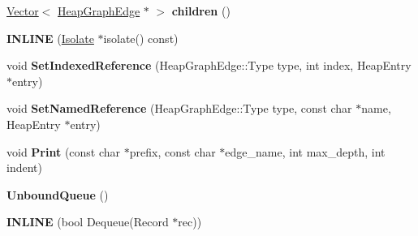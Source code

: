 \begin{DoxyCompactItemize}
\item 
\hyperlink{classv8_1_1internal_1_1_vector}{Vector}$<$ \hyperlink{classv8_1_1_heap_graph_edge}{Heap\+Graph\+Edge} $\ast$ $>$ {\bfseries children} ()\hypertarget{classv8_1_1internal_1_1_b_a_s_e___e_m_b_e_d_d_e_d_aa741a059de0f22e9ae33e42d264973ef}{}\label{classv8_1_1internal_1_1_b_a_s_e___e_m_b_e_d_d_e_d_aa741a059de0f22e9ae33e42d264973ef}

\item 
{\bfseries I\+N\+L\+I\+NE} (\hyperlink{classv8_1_1internal_1_1_isolate}{Isolate} $\ast$isolate() const)\hypertarget{classv8_1_1internal_1_1_b_a_s_e___e_m_b_e_d_d_e_d_abe48395c5889049313cd023c1f5b0589}{}\label{classv8_1_1internal_1_1_b_a_s_e___e_m_b_e_d_d_e_d_abe48395c5889049313cd023c1f5b0589}

\item 
void {\bfseries Set\+Indexed\+Reference} (Heap\+Graph\+Edge\+::\+Type type, int index, Heap\+Entry $\ast$entry)\hypertarget{classv8_1_1internal_1_1_b_a_s_e___e_m_b_e_d_d_e_d_a05322892c3a11c74aaf0c2742f7a133d}{}\label{classv8_1_1internal_1_1_b_a_s_e___e_m_b_e_d_d_e_d_a05322892c3a11c74aaf0c2742f7a133d}

\item 
void {\bfseries Set\+Named\+Reference} (Heap\+Graph\+Edge\+::\+Type type, const char $\ast$name, Heap\+Entry $\ast$entry)\hypertarget{classv8_1_1internal_1_1_b_a_s_e___e_m_b_e_d_d_e_d_a89f646b0a35a85b0e7f8d8d2a692c996}{}\label{classv8_1_1internal_1_1_b_a_s_e___e_m_b_e_d_d_e_d_a89f646b0a35a85b0e7f8d8d2a692c996}

\item 
void {\bfseries Print} (const char $\ast$prefix, const char $\ast$edge\+\_\+name, int max\+\_\+depth, int indent)\hypertarget{classv8_1_1internal_1_1_b_a_s_e___e_m_b_e_d_d_e_d_acc9a65d9f6aff672c4c526cc0b6301fd}{}\label{classv8_1_1internal_1_1_b_a_s_e___e_m_b_e_d_d_e_d_acc9a65d9f6aff672c4c526cc0b6301fd}

\item 
{\bfseries Unbound\+Queue} ()\hypertarget{classv8_1_1internal_1_1_b_a_s_e___e_m_b_e_d_d_e_d_a1641cbdb26c90cdf84290c658b1578a9}{}\label{classv8_1_1internal_1_1_b_a_s_e___e_m_b_e_d_d_e_d_a1641cbdb26c90cdf84290c658b1578a9}

\item 
{\bfseries I\+N\+L\+I\+NE} (bool Dequeue(Record $\ast$rec))\hypertarget{classv8_1_1internal_1_1_b_a_s_e___e_m_b_e_d_d_e_d_a83a212e27844a0180a743d0c534d0e2d}{}\label{classv8_1_1internal_1_1_b_a_s_e___e_m_b_e_d_d_e_d_a83a212e27844a0180a743d0c534d0e2d}


\end{DoxyCompactItemize}

